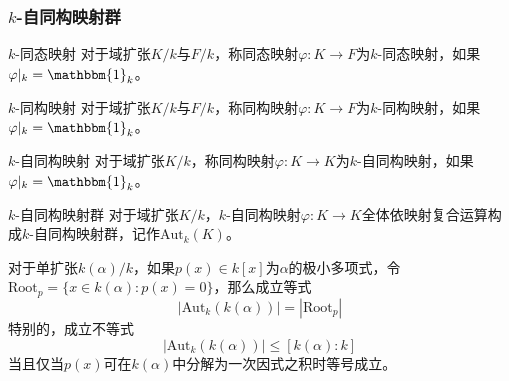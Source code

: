 \subsubsection{$k$-自同构映射群}

\begin{definition}{$k$-同态映射}
	对于域扩张$K/k$与$F/k$，称同态映射$\varphi:K\to F$为$k$-同态映射，如果$\varphi|_k=\mathbbm{1}_k$。
\end{definition}

\begin{definition}{$k$-同构映射}
	对于域扩张$K/k$与$F/k$，称同构映射$\varphi:K\to F$为$k$-同构映射，如果$\varphi|_k=\mathbbm{1}_k$。
\end{definition}

\begin{definition}{$k$-自同构映射}
	对于域扩张$K/k$，称同构映射$\varphi:K\to K$为$k$-自同构映射，如果$\varphi|_k=\mathbbm{1}_k$。
\end{definition}

\begin{definition}{$k$-自同构映射群}
	对于域扩张$K/k$，$k$-自同构映射$\varphi:K\to K$全体依映射复合运算构成$k$-自同构映射群，记作$\text{Aut}_k(K)$。
\end{definition}

\begin{proposition}
	对于单扩张$k(\alpha)/k$，如果$p(x)\in k[x]$为$\alpha$的极小多项式，令$\text{Root}_p=\{ x\in k(\alpha):p(x)=0 \}$，那么成立等式%
	$$
	|\text{Aut}_k(k(\alpha))|=|\text{Root}_p|
	$$
	特别的，成立不等式
	$$
	|\text{Aut}_k(k(\alpha))|\le[k(\alpha):k]
	$$
	当且仅当$p(x)$可在$k(\alpha)$中分解为一次因式之积时等号成立。
\end{proposition}

